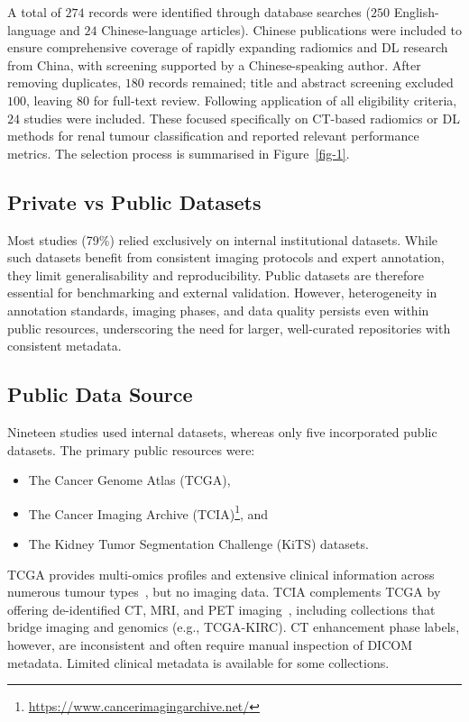 \documentclass[final,british,a4paper,12pt]{phdthesis}
\begin{document}
A total of $274$ records were identified through database searches ($250$ English-language and $24$ Chinese-language articles). Chinese publications were included to ensure comprehensive coverage of rapidly expanding radiomics and DL research from China, with screening supported by a Chinese-speaking author. After removing duplicates, $180$ records remained; title and abstract screening excluded $100$, leaving $80$ for full-text review. Following application of all eligibility criteria, $24$ studies were included. These focused specifically on CT-based radiomics or DL methods for renal tumour classification and reported relevant performance metrics. The selection process is summarised in Figure~\ref{fig-1}.

\subsection{Private vs Public Datasets}

Most studies (79\%) relied exclusively on internal institutional datasets. While such datasets benefit from consistent imaging protocols and expert annotation, they limit generalisability and reproducibility. Public datasets are therefore essential for benchmarking and external validation. However, heterogeneity in annotation standards, imaging phases, and data quality persists even within public resources, underscoring the need for larger, well-curated repositories with consistent metadata.

\subsection{Public Data Source}\label{Sec:dataset}

Nineteen studies used internal datasets, whereas only five incorporated public datasets. The primary public resources were:
\begin{itemize}
    \item The Cancer Genome Atlas (TCGA),
    \item The Cancer Imaging Archive (TCIA)\footnote{\href{https://www.cancerimagingarchive.net/}{https://www.cancerimagingarchive.net/}}, and
    \item The Kidney Tumor Segmentation Challenge (KiTS) datasets.
\end{itemize}

TCGA provides multi-omics profiles and extensive clinical information across numerous tumour types~\cite{weinstein2013cancer}, but no imaging data. TCIA complements TCGA by offering de-identified CT, MRI, and PET imaging~\cite{clark2013cancer}, including collections that bridge imaging and genomics (e.g., TCGA-KIRC). CT enhancement phase labels, however, are inconsistent and often require manual inspection of DICOM metadata. Limited clinical metadata is available for some collections.
\end{document}

